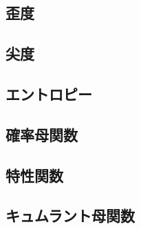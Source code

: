 \documentclass[dvipdfmx]{jsarticle}
\begin{document}
 \subsection{歪度}
 \subsection{尖度}
 \subsection{エントロピー}
 \subsection{確率母関数}
 \subsection{特性関数}
 \subsection{キュムラント母関数}
\end{document}
